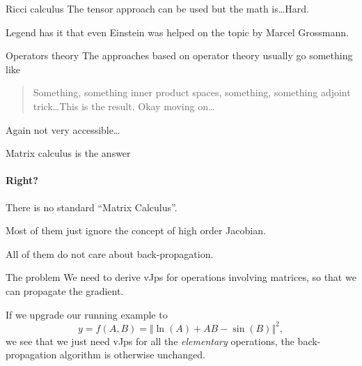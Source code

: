 \documentclass[noamsthm]{beamer}
\begin{document}
\begin{frame}{Ricci calculus}
The tensor approach can be used but the math is\dots Hard.

Legend has it that even Einstein was helped on the topic by Marcel Grossmann.
\end{frame}

\begin{frame}{Operators theory}
The approaches based on operator theory usually go something like
\begin{quote}
Something, something inner product spaces, something, something adjoint
trick\dots This is the result. Okay moving on\dots
\end{quote}

Again not very accessible\dots
\end{frame}

\begin{frame}{Matrix calculus is the answer}
\framesubtitle{Right?}
There is no standard ``Matrix Calculus''.

Most of them just ignore the concept of high order Jacobian.

All of them do not care about back-propagation.
\end{frame}

\begin{frame}{The problem}
We need to derive vJps for operations involving matrices, so that we can propagate the gradient.

If we upgrade our running example to
\[y = f(A,B) = \Vert\!\ln(A) + A B - \sin(B)\Vert^2,\]
we see that we just need vJps for all the \emph{elementary} operations, the
back-propagation algorithm is otherwise unchanged.
\end{frame}
\end{document}
